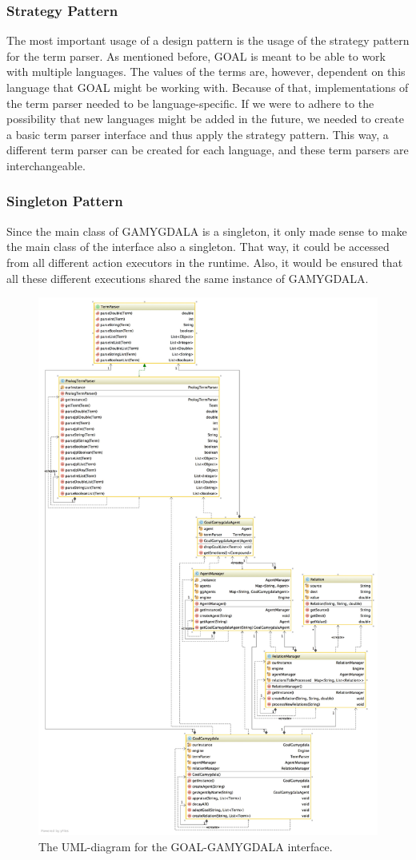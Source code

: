 \subsubsection{Strategy Pattern}
The most important usage of a design pattern is the usage of the strategy pattern for the term parser. As mentioned before, GOAL is meant to be able to work with multiple languages. The values of the terms are, however, dependent on this language that GOAL might be working with. Because of that, implementations of the term parser needed to be language-specific. If we were to adhere to the possibility that new languages might be added in the future, we needed to create a basic term parser interface and thus apply the strategy pattern. This way, a different term parser can be created for each language, and these term parsers are interchangeable.
\subsubsection{Singleton Pattern}
Since the main class of GAMYGDALA is a singleton, it only made sense to make the main class of the interface also a singleton. That way, it could be accessed from all different action executors in the runtime. Also, it would be ensured that all these different executions shared the same instance of GAMYGDALA.

\begin{figure}
\includegraphics[width=\linewidth]{diagram-goalgamygdala}
\caption{The UML-diagram for the GOAL-GAMYGDALA interface.}
\end{figure}